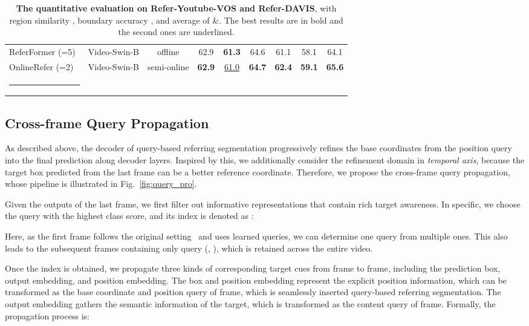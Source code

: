 \documentclass[10pt,twocolumn,letterpaper]{article}
\makeatletter
\newcommand{\thickhline}{\noalign {\ifnum 0=`}\fi \hrule height 1pt
	\futurelet \reserved@a \@xhline
}
\makeatother
\begin{document}
\begin{table*}[t]
{\begin{tabular}{l||c|c|ccc|ccc}
                ReferFormer (=5)~\cite{referformer} & Video-Swin-B & \textcolor{mygray}{offline} & 62.9 & \textbf{61.3} & 64.6 & 61.1 &58.1 &64.1\\
                \rowcolor[gray]{0.9}
                OnlineRefer (=2) & Video-Swin-B & semi-online &  \textbf{62.9}& \underline{61.0} &\textbf{64.7}	& \textbf{62.4}	&\textbf{59.1} & \textbf{65.6} \\
			\hline \thickhline
	\end{tabular} }
	\vspace{-8pt}
	\caption{\textbf{The quantitative evaluation on Refer-Youtube-VOS  and Refer-DAVIS}, with region similarity , boundary accuracy , and average of \&. The best results are in bold and the second ones are underlined.}
	\vspace{-4mm}
	\label{table:sota_ytb}
\end{table*}



\subsection{Cross-frame Query Propagation}
\label{sec:query propagation}



As described above, the decoder of query-based referring segmentation progressively refines the base coordinates from the position query into the final prediction along decoder layers.
Inspired by this, we additionally consider the refinement domain in \textit{temporal axis}, because the target box predicted from the last frame can be a better reference coordinate.
Therefore, we propose the cross-frame query propagation, whose pipeline is illustrated in Fig.~\ref{fig:query_pro}.



Given the outputs of the last frame, we first filter out informative representations that contain rich target awareness.
In specific, we choose the query with the highest class score, and its index is denoted as :

Here, as the first frame follows the original setting~\cite{deformable} and uses  learned queries, we can determine one query from multiple ones.
This also leads to the subsequent frames containing only  query (\ie, ), which is retained across the entire video.



Once the index is obtained,  we propagate three kinds of corresponding target cues from  frame to   frame, including the prediction box, output embedding, and position embedding.
The box and position embedding represent the explicit position information, which can be transformed as the base coordinate and position query of    frame, which is seamlessly inserted query-based referring segmentation.
The output embedding gathers the semantic information of the target, which is transformed as the content query of    frame. Formally, the propagation process is:
\end{document}
